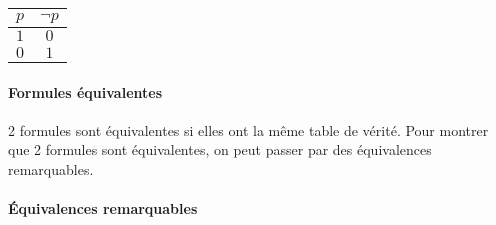 \documentclass[11pt,twoside,openright,a4paper]{report}
\begin{document}
\begin{center}

	\begin{tabular}{|c|c|}
		\hline
		$p$ & $\neg p$ \\
		\hline
		$1$ & $0$ \\
		$0$ & $1$ \\
		\hline
	\end{tabular}
	
\end{center}


\paragraph{Formules équivalentes} %
\label{par:formules_quivalentes}

2 formules sont équivalentes si elles ont la même table de vérité. Pour montrer que 2 formules sont équivalentes, on peut passer par des équivalences remarquables.


\paragraph{Équivalences remarquables} %
\label{par:_quivalences_remarquables}
\end{document}
